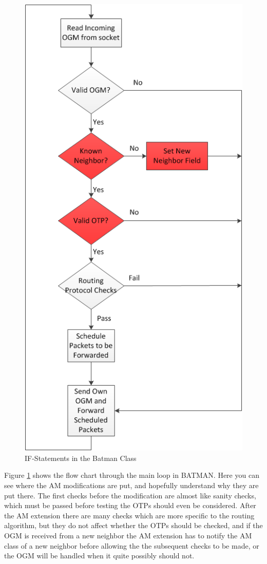 \begin{figure}[h!]
	\centering
	\includegraphics[totalheight=1\textheight]{images/batman_if_statements.png}
	\caption{IF-Statements in the Batman Class}
	\label{fig:batman_if_statements}
\end{figure}

Figure \ref{fig:batman_if_statements} shows the flow chart through the main loop
in BATMAN. Here you can see where the AM modifications are put, and hopefully
understand why they are put there. The first checks before the modification are
almost like sanity checks, which must be passed before testing the \acp{OTP}
should even be considered. After the AM extension there are many checks which
are more specific to the routing algorithm, but they do not affect whether the
\acp{OTP} should be checked, and if the OGM is received from a new neighbor the
AM extension has to notify the AM class of a new neighbor before allowing the
the subsequent checks to be made, or the OGM will be handled when it quite
possibly should not.

